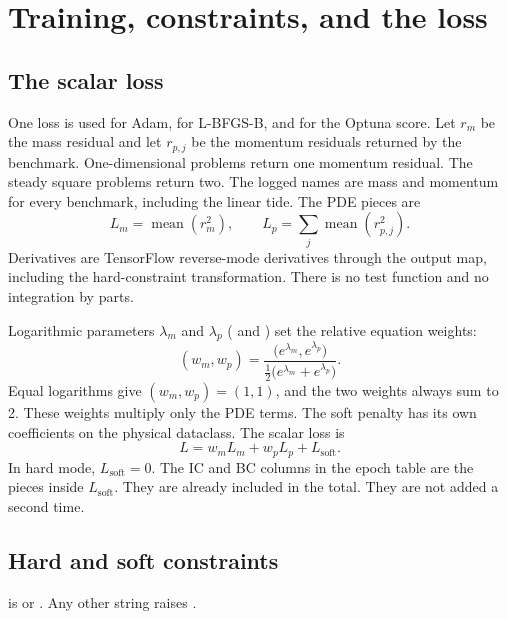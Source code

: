 \chapter{Training, constraints, and the loss}
\label{ch:training}

\section{The scalar loss}

One loss is used for Adam, for L-BFGS-B, and for the Optuna score.
Let \(r_{m}\) be the mass residual and let \(r_{p,j}\) be the momentum residuals returned by the benchmark.
One-dimensional problems return one momentum residual.
The steady square problems return two.
The logged names are mass and momentum for every benchmark, including the linear tide.
The PDE pieces are
\begin{equation}
L_{m} = \operatorname{mean}(r_{m}^{2}),
\qquad
L_{p} = \sum_{j} \operatorname{mean}(r_{p,j}^{2}).
\end{equation}
Derivatives are TensorFlow reverse-mode derivatives through the output map, including the hard-constraint transformation.
There is no test function and no integration by parts.

Logarithmic parameters \(\lambda_{m}\) and \(\lambda_{p}\) ( and ) set the relative equation weights:
\begin{equation}
\label{eq:weights}
(w_{m}, w_{p})
=
\frac{\big(e^{\lambda_{m}}, e^{\lambda_{p}}\big)}
{\tfrac12\big(e^{\lambda_{m}}+e^{\lambda_{p}}\big)}.
\end{equation}
Equal logarithms give \((w_{m},w_{p})=(1,1)\), and the two weights always sum to 2.
These weights multiply only the PDE terms.
The soft penalty has its own coefficients on the physical dataclass.
The scalar loss is
\begin{equation}
\label{eq:loss}
L = w_{m} L_{m} + w_{p} L_{p} + L_{\mathrm{soft}}.
\end{equation}
In hard mode, \(L_{\mathrm{soft}}=0\).
The IC and BC columns in the epoch table are the pieces inside \(L_{\mathrm{soft}}\).
They are already included in the total.
They are not added a second time.

\section{Hard and soft constraints}
\label{sec:constraints}

 is  or .
Any other string raises .


